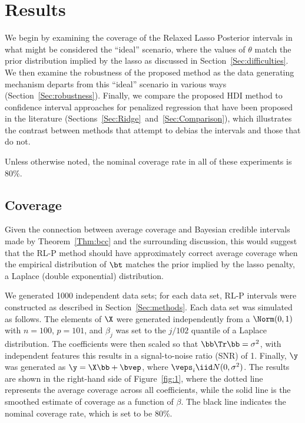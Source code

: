 \section{Results}
\label{Sec:results}

We begin by examining the coverage of the Relaxed Lasso Posterior intervals in what might be considered the ``ideal'' scenario, where the values of $\theta$ match the prior distribution implied by the lasso as discussed in Section~\ref{Sec:difficulties}. We then examine the robustness of the proposed method as the data generating mechanism departs from this ``ideal'' scenario in various ways (Section~\ref{Sec:robustness}). Finally, we compare the proposed HDI method to confidence interval approaches for penalized regression that have been proposed in the literature (Sections~\ref{Sec:Ridge}~and~\ref{Sec:Comparison}), which illustrates the contrast between methods that attempt to debias the intervals and those that do not.

Unless otherwise noted, the nominal coverage rate in all of these experiments is 80\%.

\subsection{Coverage}\label{Sec:coverage}

Given the connection between average coverage and Bayesian credible intervals made by Theorem~\ref{Thm:bcc} and the surrounding discussion, this would suggest that the RL-P method should have approximately correct average coverage when the empirical distribution of $\bt$ matches the prior implied by the lasso penalty, a Laplace (double exponential) distribution.

We generated 1000 independent data sets; for each data set, RL-P intervals were constructed as described in Section~\ref{Sec:methods}. Each data set was simulated as follows. The elements of $\X$ were generated independently from a $\Norm(0, 1)$ with $n = 100$, $p = 101$, and $\beta_j$ was set to the $j/102$ quantile of a Laplace distribution. The coefficients were then scaled so that $\bb \Tr\bb = \sigma^2$, with independent features this results in a signal-to-noise ratio (SNR) of 1. Finally, $\y$ was generated as $\y = \X\bb + \bvep$, where $\veps_i \iid N(0, \sigma^2)$. The results are shown in the right-hand side of Figure~\ref{fig:1}, where the dotted line represents the average coverage across all coefficients, while the solid line is the smoothed estimate of coverage as a function of $\beta$. The black line indicates the nominal coverage rate, which is set to be 80\%.

